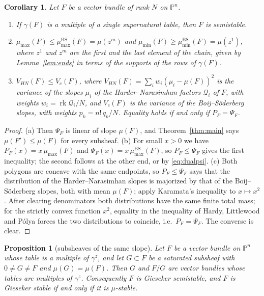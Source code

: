 \documentclass[11pt]{amsart}
\newtheorem{proposition}[theorem]{Proposition}
\newtheorem{corollary}[theorem]{Corollary}
\theoremstyle{definition}
\theoremstyle{remark}
\newcommand{\PP}{\mathbb{P}}
\newcommand{\cQ}{\mathcal{Q}}
\newcommand{\BS}{\mathrm{BS}}
\DeclareMathOperator{\rk}{rk}
\begin{document}
\begin{corollary}\label{cor:supernatural}
Let $F$ be a vector bundle of rank $N$ on $\PP^n$.
\begin{enumerate}[label=\textup{(\alph*)}]
\item If $\gamma(F)$ is a multiple of a single supernatural table, then $F$ is semistable.
\item $\mu_{\max}(F)\le\mu^\BS_{\max}(F)=\mu(z^m)$ and $\mu_{\min}(F)\ge\mu^\BS_{\min}(F)=\mu(z^1)$, where $z^1$ and $z^m$ are the first and the last element of the chain, given by Lemma~\textup{\ref{lem:ends}} in terms of the supports of the rows of $\gamma(F)$.
\item $V_{HN}(F)\le V_c(F)$, where $V_{HN}(F)=\sum_iw_i(\mu_i-\mu(F))^2$ is the variance of the slopes $\mu_i$ of the Harder--Narasimhan factors $\cQ_i$ of $F$, with weights $w_i=\rk\cQ_i/N$, and $V_c(F)$ is the variance of the Boij--Söderberg slopes, with weights $p_k=n!\,q_k/N$. Equality holds if and only if $P_F=\Psi_F$.
\end{enumerate}
\end{corollary}

\begin{proof}
(a) Then $\Psi_F$ is linear of slope $\mu(F)$, and Theorem~\ref{thm:main} says $\mu(F')\le\mu(F)$ for every subsheaf. (b) For small $x>0$ we have $P_F(x)=x\,\mu_{\max}(F)$ and $\Psi_F(x)=x\,\mu^\BS_{\max}(F)$, so $P_F\le\Psi_F$ gives the first inequality; the second follows at the other end, or by \eqref{eq:dualpsi}. (c) Both polygons are concave with the same endpoints, so $P_F\le\Psi_F$ says that the distribution of the Harder--Narasimhan slopes is majorized by that of the Boij--Söderberg slopes, both with mean $\mu(F)$; apply Karamata's inequality \cite{Ka32} to $x\mapsto x^2$. After clearing denominators both distributions have the same finite total mass; for the strictly convex function $x^2$, equality in the inequality of Hardy, Littlewood and P\'olya \cite{HLP} forces the two distributions to coincide, i.e.\ $P_F=\Psi_F$. The converse is clear.
\end{proof}

\begin{proposition}[subsheaves of the same slope]\label{prop:sameslope}
Let $F$ be a vector bundle on $\PP^n$ whose table is a multiple of $\gamma^z$, and let $G\subset F$ be a saturated subsheaf with $0\ne G\ne F$ and $\mu(G)=\mu(F)$. Then $G$ and $F/G$ are vector bundles whose tables are multiples of $\gamma^z$. Consequently $F$ is Gieseker semistable, and $F$ is Gieseker stable if and only if it is $\mu$-stable.
\end{proposition}
\end{document}
